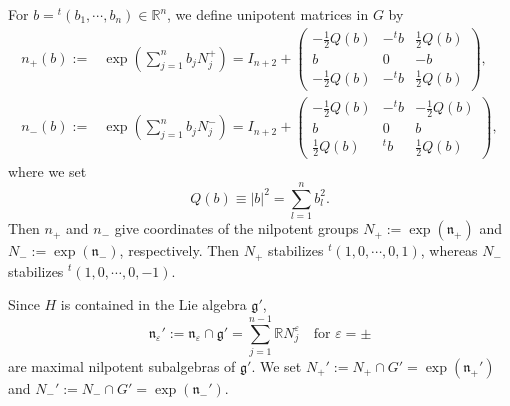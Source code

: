 \medskip
For $b={}^t(b_1, \cdots, b_n) \in {\mathbb{R}}^n$, 
 we define unipotent matrices in $G$ by
\begin{align}
n_+(b):=& \exp(\sum_{j=1}^n b_j N_j^+)=I_{n+2} 
       + 
\begin{pmatrix} 
     - \frac 1 2 Q(b) &-{}^{t\!}b & \frac 1 2 Q(b) 
\\
       b & 0 & -b
\\
     - \frac 1 2 Q(b) &-{}^{t\!}b & \frac 1 2 Q(b) 
\end{pmatrix},
\label{eqn:nplus}
\\
n_-(b):=&\exp(\sum_{j=1}^n b_j N_j^-)= I_{n+2} 
       + 
\begin{pmatrix} 
     - \frac 1 2 Q(b) &-{}^{t\!}b & -\frac 1 2 Q(b) 
\\
       b & 0 & b
\\
     \frac 1 2 Q(b) &{}^{t\!}b & \frac 1 2 Q(b) 
\end{pmatrix}, 
\label{eqn:nbar}
\end{align}
where we set
\begin{equation}
\label{eqn:Qn}
Q(b)\equiv |b|^2 =\sum_{l=1}^n b_l^2.  
\end{equation}
Then 
$n_+$
 and 
$n_-$ give coordinates
 of the nilpotent groups 
 $N_+ := \exp ({\mathfrak{n}}_+)$ and 
 $N_- := \exp ({\mathfrak{n}}_-)$, 
 respectively.  
Then $N_+$ stabilizes ${}^{t\!}(1,0,\cdots,0,1)$, 
 whereas $N_-$ stabilizes ${}^{t\!}(1,0,\cdots,0,-1)$.  




Since $H$ is contained in the Lie algebra ${\mathfrak {g}}'$, 
\[
  {\mathfrak{n}}_{\varepsilon}'
  :=
  {\mathfrak{n}}_{\varepsilon} \cap {\mathfrak{g}}'
  =
  \sum_{j=1}^{n-1} {\mathbb{R}} N_j^{\varepsilon}
\quad
  \text{for ${\varepsilon}=\pm$}
\]
are maximal nilpotent subalgebras 
 of ${\mathfrak{g}}'$.  
We set 
 $N_+' := N_+ \cap G' = \exp ({\mathfrak{n}}_+')$
 and 
 $N_-' := N_- \cap G' = \exp ({\mathfrak{n}}_-')$.  



